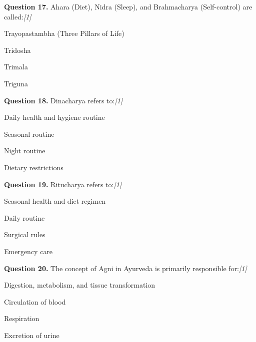 \documentclass[11pt,a4paper]{article}
\newcommand{\pts}[1]{\hfill   \textit{[#1]}}
\begin{document}
\medskip




\noindent   \textbf{Question 17.} Ahara (Diet), Nidra (Sleep), and Brahmacharya (Self-control) are called:\pts{1}

\begin{parts}
  \item Trayopastambha (Three Pillars of Life)
  \item Tridosha
  \item Trimala
  \item Triguna
\end{parts}

\medskip




\noindent   \textbf{Question 18.} Dinacharya refers to:\pts{1}

\begin{parts}
  \item Daily health and hygiene routine
  \item Seasonal routine
  \item Night routine
  \item Dietary restrictions
\end{parts}

\medskip




\noindent   \textbf{Question 19.} Ritucharya refers to:\pts{1}

\begin{parts}
  \item Seasonal health and diet regimen
  \item Daily routine
  \item Surgical rules
  \item Emergency care
\end{parts}

\medskip




\noindent   \textbf{Question 20.} The concept of Agni in Ayurveda is primarily responsible for:\pts{1}

\begin{parts}
  \item Digestion, metabolism, and tissue transformation
  \item Circulation of blood
  \item Respiration
  \item Excretion of urine
\end{parts}

\medskip
\end{document}
